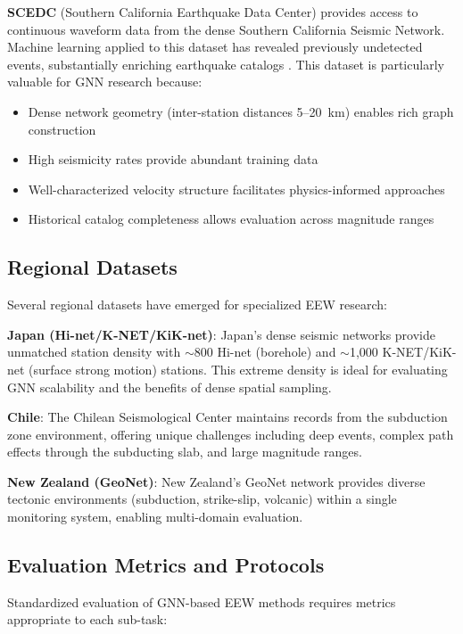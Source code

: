 \documentclass[review,authoryear]{elsarticle}
\begin{document}
\textbf{SCEDC} (Southern California Earthquake Data Center) \citep{ross2018scedc} provides access to continuous waveform data from the dense Southern California Seismic Network. Machine learning applied to this dataset has revealed previously undetected events, substantially enriching earthquake catalogs \citep{tan2021machine}. This dataset is particularly valuable for GNN research because:
\begin{itemize}
  \item Dense network geometry (inter-station distances 5--20~km) enables rich graph construction
  \item High seismicity rates provide abundant training data
  \item Well-characterized velocity structure facilitates physics-informed approaches
  \item Historical catalog completeness allows evaluation across magnitude ranges
\end{itemize}

\subsection{Regional Datasets}

Several regional datasets have emerged for specialized EEW research:

\textbf{Japan (Hi-net/K-NET/KiK-net)}: Japan's dense seismic networks provide unmatched station density with $\sim$800 Hi-net (borehole) and $\sim$1,000 K-NET/KiK-net (surface strong motion) stations. This extreme density is ideal for evaluating GNN scalability and the benefits of dense spatial sampling.

\textbf{Chile}: The Chilean Seismological Center maintains records from the subduction zone environment, offering unique challenges including deep events, complex path effects through the subducting slab, and large magnitude ranges.

\textbf{New Zealand (GeoNet)}: New Zealand's GeoNet network provides diverse tectonic environments (subduction, strike-slip, volcanic) within a single monitoring system, enabling multi-domain evaluation.

\subsection{Evaluation Metrics and Protocols}

Standardized evaluation of GNN-based EEW methods requires metrics appropriate to each sub-task:
\end{document}
